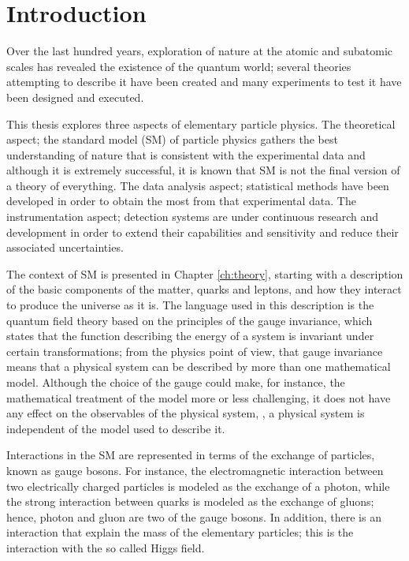 \chapter{Introduction}
\label{ch:intro}

Over the last hundred years, exploration of nature at the atomic and subatomic scales has revealed the existence of the quantum world; several theories attempting to describe it have been created and many experiments to test it have been designed and executed.

This thesis explores three aspects of elementary particle physics. The theoretical aspect; the standard model (SM) of particle physics gathers the best understanding of nature that is consistent with the experimental data and although it is extremely successful, it is known that SM is not the final version of a theory of everything. The data analysis aspect; statistical methods have been developed in order to obtain the most from that experimental data. The instrumentation aspect; detection systems are under continuous research and development in order to extend their capabilities and sensitivity and reduce their associated uncertainties. 

The context of SM is presented in Chapter \ref{ch:theory}, starting with a description of the basic components of the matter, quarks and leptons, and how they interact to produce the universe as it is. The language used in this description is the quantum field theory based on the principles of the gauge invariance, which states that the function describing the energy of a system is invariant under certain transformations; from the physics point of view, that gauge invariance means that a physical system can be described by more than one mathematical model. Although the choice of the gauge could make, for instance, the mathematical treatment of the model more or less challenging, it does not have any effect on the observables of the physical system, \ie, a physical system is independent of the model used to describe it.

Interactions in the SM are represented in terms of the exchange of particles, known as gauge bosons. For instance, the electromagnetic interaction between two electrically charged particles is modeled as the exchange of a photon, while the strong interaction between quarks is modeled as the exchange of gluons; hence, photon and gluon are two of the gauge bosons. In addition, there is an interaction that explain the mass of the elementary particles; this is the interaction with the so called Higgs field.    

